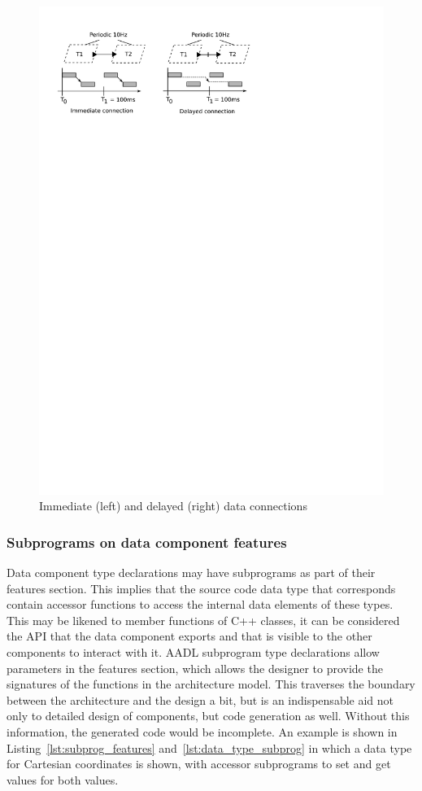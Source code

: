 \begin{figure}
\centering
\includegraphics[scale=0.75]{figs/conn_semantics}
\caption{Immediate (left) and delayed (right) data connections}
\label{fig:conn_semantics}
\end{figure}

\subsubsection{Subprograms on data component features}
Data component type declarations may have subprograms as part of their
features section. This implies that the source code data type that
corresponds contain accessor functions to access the internal data
elements of these types. This may be likened to member functions of
C++ classes, it can be considered the API that the data component
exports and that is visible to the other components to interact with
it. AADL subprogram type declarations allow parameters in the features
section, which allows the designer to provide the signatures of the
functions in the architecture model. This traverses the boundary
between the architecture and the design a bit, but is an indispensable
aid not only to detailed design of components, but code generation as
well. Without this information, the generated code would be
incomplete. An example is shown in Listing~\ref{lst:subprog_features}
and~\ref{lst:data_type_subprog} in which a data type for Cartesian
coordinates is shown, with accessor subprograms to set and get values
for both values.

